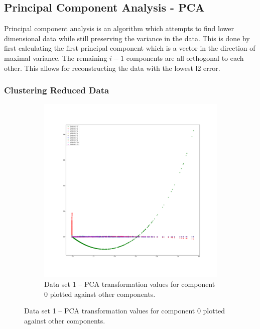 \documentclass[
letterpaper, %
]{IEEEtran}
\begin{document}
	\subsection{Principal Component Analysis - PCA}
	Principal component analysis is an algorithm which attempts to find lower dimensional data while still preserving the variance in the data. This is done by first calculating the first principal component which is a vector in the direction of maximal variance. The remaining $i -1$ components are all orthogonal to each other. This allows for reconstructing the data with the lowest l2 error. 
	\subsubsection{Clustering Reduced Data}
	\begin{figure}[!b]
		\begin{subfigure}{1.0\linewidth}
			\centering
			\includegraphics[width=\linewidth]{./images/ds1/pca/scatter/12components.png}
			\caption{Data set 1 -- PCA transformation values for component 0 plotted against other components.}
			\label{fig:pcads1scatter}
		\end{subfigure}
	\end{figure}
\end{document}
